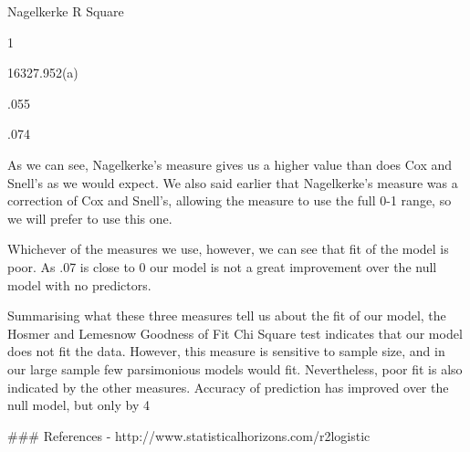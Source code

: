 Nagelkerke R Square

1

16327.952(a)

.055

.074

As we can see, Nagelkerke’s measure gives us a higher value than does Cox and Snell’s as we would expect. We also said earlier that Nagelkerke’s measure was a correction of Cox and Snell’s, allowing the measure to use the full 0-1 range, so we will prefer to use this one.

Whichever of the measures we use, however, we can see that fit of the model is poor. As .07 is close to 0 our model is not a great improvement over the null model with no predictors.

Summarising what these three measures tell us about the fit of our model, the Hosmer and Lemesnow Goodness of Fit Chi Square test indicates that our model does not fit the data. However, this measure is sensitive to sample size, and in our large sample few parsimonious models would fit. Nevertheless, poor fit is also indicated by the other measures. Accuracy of prediction has improved over the null model, but only by 4%

### References
- http://www.statisticalhorizons.com/r2logistic
